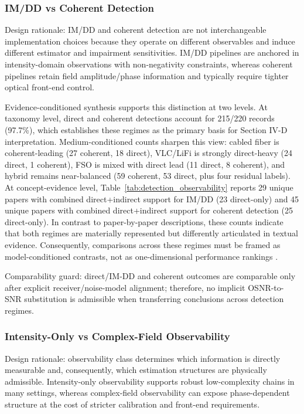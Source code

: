 \documentclass[lettersize,journal]{IEEEtran}
\begin{document}
\subsubsection{IM/DD vs Coherent Detection}
Design rationale: IM/DD and coherent detection are not interchangeable implementation choices because they operate on different observables and induce different estimator and impairment sensitivities. IM/DD pipelines are anchored in intensity-domain observations with non-negativity constraints, whereas coherent pipelines retain field amplitude/phase information and typically require tighter optical front-end control.

Evidence-conditioned synthesis supports this distinction at two levels. At taxonomy level, direct and coherent detections account for 215/220 records (97.7\%), which establishes these regimes as the primary basis for Section IV-D interpretation. Medium-conditioned counts sharpen this view: cabled fiber is coherent-leading (27 coherent, 18 direct), VLC/LiFi is strongly direct-heavy (24 direct, 1 coherent), FSO is mixed with direct lead (11 direct, 8 coherent), and hybrid remains near-balanced (59 coherent, 53 direct, plus four residual labels). At concept-evidence level, Table~\ref{tab:detection_observability} reports 29 unique papers with combined direct+indirect support for IM/DD (23 direct-only) and 45 unique papers with combined direct+indirect support for coherent detection (25 direct-only). In contrast to paper-by-paper descriptions, these counts indicate that both regimes are materially represented but differently articulated in textual evidence. Consequently, comparisons across these regimes must be framed as model-conditioned contrasts, not as one-dimensional performance rankings \cite{O_ISAC_001,O_ISAC_023,O_ISAC_028,O_ISAC_029,O_ISAC_190}.

Comparability guard: direct/IM-DD and coherent outcomes are comparable only after explicit receiver/noise-model alignment; therefore, no implicit OSNR-to-SNR substitution is admissible when transferring conclusions across detection regimes.

\subsubsection{Intensity-Only vs Complex-Field Observability}
Design rationale: observability class determines which information is directly measurable and, consequently, which estimation structures are physically admissible. Intensity-only observability supports robust low-complexity chains in many settings, whereas complex-field observability can expose phase-dependent structure at the cost of stricter calibration and front-end requirements.
\end{document}
